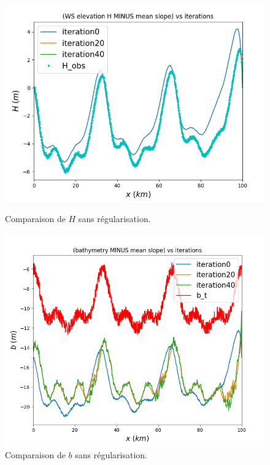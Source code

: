 \documentclass{article}
\begin{document}
\begin{figure}[H]

    \begin{minipage}[b]{0.45\linewidth}
        \centering
        \includegraphics[width=\linewidth]{Images_Ayoub/No_Regularisation/H_Comparaison.png}
        \caption{Comparaison de $H$ sans régularisation.}
        \label{fig:h-comparaison}
    \end{minipage}
    \hfill
    \begin{minipage}[b]{0.45\linewidth}
        \centering
        \includegraphics[width=\linewidth]{Images_Ayoub/No_Regularisation/b_Comparaison.png}
        \caption{Comparaison de $b$ sans régularisation.}
        \label{fig:b-comparaison}
    \end{minipage}


\end{figure}
\end{document}
